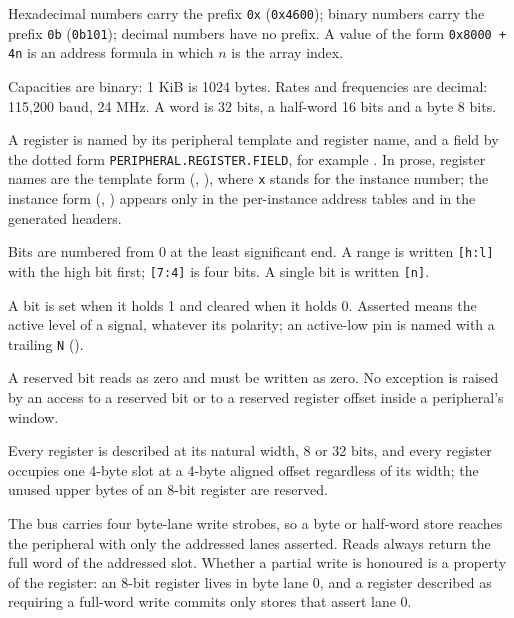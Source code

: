 \documentclass[11pt,pdftex,openany,letterpaper]{report}
\begin{document}
\begin{description}[style=nextline, leftmargin=0pt, itemsep=2pt]
	\item[Numbers] Hexadecimal numbers carry the prefix \texttt{0x} (\texttt{0x4600}); binary numbers carry the prefix \texttt{0b} (\texttt{0b101}); decimal numbers have no prefix. A value of the form \texttt{0x8000 + 4n} is an address formula in which $n$ is the array index.
	\item[Units] Capacities are binary: 1 KiB is 1024 bytes. Rates and frequencies are decimal: 115,200 baud, 24 MHz. A word is 32 bits, a half-word 16 bits and a byte 8 bits.
	\item[Registers and fields] A register is named by its peripheral template and register name, and a field by the dotted form \texttt{PERIPHERAL.\allowbreak REGISTER.\allowbreak FIELD}, for example . In prose, register names are the template form (, ), where \texttt{x} stands for the instance number; the instance form (, ) appears only in the per-instance address tables and in the generated headers.
	\item[Bit ranges] Bits are numbered from 0 at the least significant end. A range is written \texttt{[h:l]} with the high bit first; \texttt{[7:4]} is four bits. A single bit is written \texttt{[n]}.
	\item[Set and clear] A bit is set when it holds 1 and cleared when it holds 0. Asserted means the active level of a signal, whatever its polarity; an active-low pin is named with a trailing \texttt{N} ().
	\item[Reserved] A reserved bit reads as zero and must be written as zero. No exception is raised by an access to a reserved bit or to a reserved register offset inside a peripheral's window.
	\item[Register width] Every register is described at its natural width, 8 or 32 bits, and every register occupies one 4-byte slot at a 4-byte aligned offset regardless of its width; the unused upper bytes of an 8-bit register are reserved.
	\item[Narrow accesses] The bus carries four byte-lane write strobes, so a byte or half-word store reaches the peripheral with only the addressed lanes asserted. Reads always return the full word of the addressed slot. Whether a partial write is honoured is a property of the register: an 8-bit register lives in byte lane 0, and a register described as requiring a full-word write commits only stores that assert lane 0.
\end{description}
\end{document}
